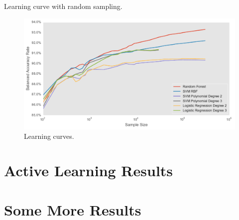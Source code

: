 Learning curve with random sampling.


\begin{figure}[ht]
	\centering
	\includegraphics[width=\textwidth]{figures/learning_curves}
	\caption{Learning curves.}
	\label{fig:learning}
\end{figure}



\section{Active Learning Results}
\label{sec:results1}

\section{Some More Results}
\label{sec:results2}

